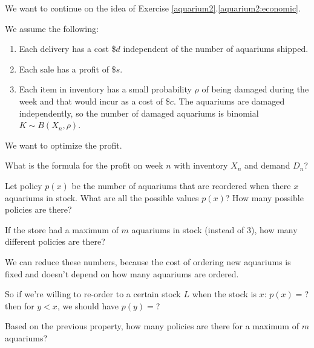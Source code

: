 \begin{slide}
\question

\begin{problem}

We want to continue on the idea of Exercise \ref{aquarium2}.\ref{aquarium2:economic}.

We assume the following:
\begin{enumerate}
	\item Each delivery has a cost \$$d$ independent of the number of aquariums shipped.
	\item Each sale has a profit of \$$s$.
	\item Each item in inventory has a small probability $\rho$ of being damaged during the week and that would incur as a cost of \$$c$. The aquariums are damaged independently, so the number of damaged aquariums is binomial $K \sim B(X_n,\rho)$.
\end{enumerate}

We want to optimize the profit.
\end{problem}

\begin{slidesonly}
\vspace{2cm}	
\end{slidesonly}


\begin{parts}
	\item What is the formula for the profit on week $n$ with inventory $X_n$ and demand $D_n$?
	\item Let policy $p(x)$ be the number of aquariums that are reordered when there $x$ aquariums in stock. What are all the possible values $p(x)$? How many possible policies are there?
	\item If the store had a maximum of $m$ aquariums in stock (instead of 3), how many different policies are there?
	\item We can reduce these numbers, because the cost of ordering new aquariums is fixed and doesn't depend on how many aquariums are ordered. 
		
		So if we're willing to re-order to a certain stock $L$ when  the stock is $x$: $p(x) = $?
		then for $y<x$, we should have $p(y)= $?
	
	\item Based on the previous property, how many policies are there for a maximum of $m$ aquariums?
	
\end{parts}

	
\end{slide}



